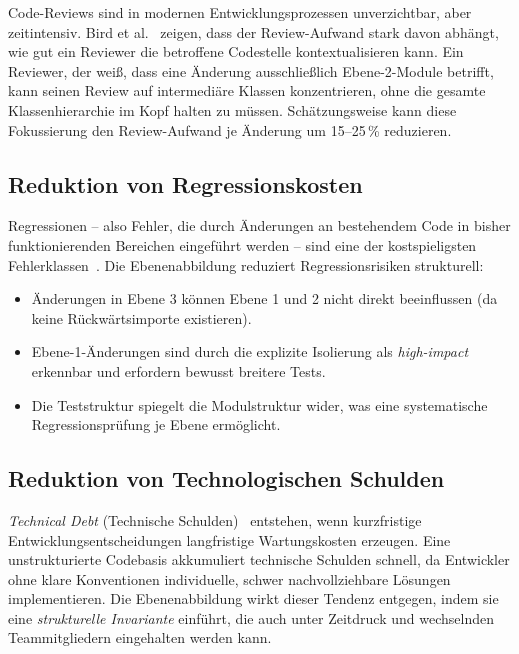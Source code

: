﻿\documentclass[a4paper,12pt]{article}
\begin{document}
Code-Reviews sind in modernen Entwicklungsprozessen unverzichtbar, aber
zeitintensiv. Bird et al.~\cite{bird2011} zeigen, dass der Review-Aufwand
stark davon abhängt, wie gut ein Reviewer die betroffene Codestelle
kontextualisieren kann. Ein Reviewer, der weiß, dass eine Änderung ausschließlich
Ebene-2-Module betrifft, kann seinen Review auf intermediäre Klassen
konzentrieren, ohne die gesamte Klassenhierarchie im Kopf halten zu müssen.
Schätzungsweise kann diese Fokussierung den Review-Aufwand je Änderung um
15--25\,\% reduzieren.

\subsection{Reduktion von Regressionskosten}

Regressionen -- also Fehler, die durch Änderungen an bestehendem Code in
bisher funktionierenden Bereichen eingeführt werden -- sind eine der
kostspieligsten Fehlerklassen~\cite{pressman2014}. Die Ebenenabbildung
reduziert Regressionsrisiken strukturell:

\begin{itemize}[leftmargin=*]
	\item Änderungen in Ebene 3 können Ebene 1 und 2 nicht direkt beeinflussen
	(da keine Rückwärtsimporte existieren).
	\item Ebene-1-Änderungen sind durch die explizite Isolierung als
	\textit{high-impact} erkennbar und erfordern bewusst breitere Tests.
	\item Die Teststruktur spiegelt die Modulstruktur wider, was eine
	systematische Regressionsprüfung je Ebene ermöglicht.
\end{itemize}

\subsection{Reduktion von Technologischen Schulden}

\textit{Technical Debt} (Technische Schulden)~\cite{cunningham1992} entstehen,
wenn kurzfristige Entwicklungsentscheidungen langfristige Wartungskosten
erzeugen. Eine unstrukturierte Codebasis akkumuliert technische Schulden schnell,
da Entwickler ohne klare Konventionen individuelle, schwer nachvollziehbare
Lösungen implementieren. Die Ebenenabbildung wirkt dieser Tendenz entgegen,
indem sie eine \textit{strukturelle Invariante} einführt, die auch unter
Zeitdruck und wechselnden Teammitgliedern eingehalten werden kann.
\end{document}
